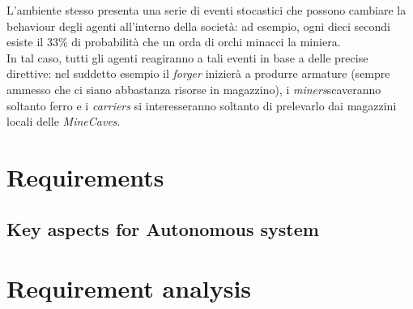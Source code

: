 \documentclass{llncs}
\newcommand{\labelsec}[1]{\label{sec:#1}}
\begin{document}
L'ambiente stesso presenta una serie di eventi stocastici che possono cambiare la behaviour degli agenti all'interno della società: ad esempio, ogni dieci secondi esiste il 33\% di probabilità che un orda di orchi minacci la miniera.\\
In tal caso, tutti gli agenti reagiranno a tali eventi in base a delle precise direttive: nel suddetto esempio il \textit{forger} inizierà a produrre armature (sempre ammesso che ci siano abbastanza risorse in magazzino), i \textit{miners}scaveranno soltanto ferro e i \textit{carriers} si interesseranno soltanto di prelevarlo dai magazzini locali delle \textit{MineCaves}.
\newpage
\section{Requirements}
\labelsec{Requirements}
\newpage
\subsection{Key aspects for Autonomous system}
\newpage
\section{Requirement analysis}
\labelsec{ReqAnalysis}
\end{document}
